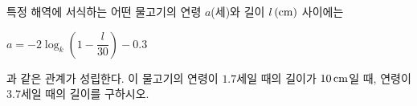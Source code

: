 특정 해역에 서식하는 어떤 물고기의 연령 $a$(세)와 길이 $l\mkern3mu (\mathrm{cm})$ 사이에는 \par\smallskip\noindent\hspace*{1.5em}$a=-2\log_k\left(1-\dfrac{l}{30}\right)-0.3$\par\smallskip\noindent 과 같은 관계가 성립한다. 이 물고기의 연령이 $1.7$세일 때의 길이가 $10\mkern3mu \mathrm{cm}$일 때, 연령이 $3.7$세일 때의 길이를 구하시오. 
